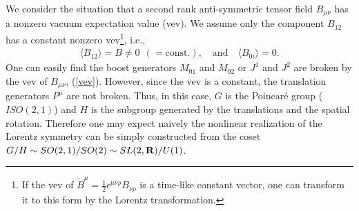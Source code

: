 \documentclass[a4paper,12pt]{article}
\begin{document}
We consider the situation that a 
second rank anti-symmetric tensor field $B_{\mu \nu}$
has a nonzero vacuum expectation value (vev).
We assume only the component $B_{12}$ has a constant 
nonzero vev\footnote{If the vev of $\tilde{B}^{\mu} = \frac{1}{2}
\epsilon^{\mu \nu \rho} B_{\nu \rho}$ is a time-like constant vector, 
one can transform it to this form by the Lorentz transformation.}, i.e.,
\begin{eqnarray}
\langle B_{12} \rangle = B \neq 0~~(= \textrm{const.}), \quad
\textrm{and} \quad \langle B_{0i} \rangle = 0. \label{vev}
\end{eqnarray}
One can easily find the boost generators $M_{01}$ and $M_{02}$ or
$J^{1}$ and $J^{2}$ are broken by the vev of $B_{\mu \nu}$, (\ref{vev}). 
However, since the vev is a constant, the translation generators
$P^{\mu}$ are not broken. Thus, in this case, $G$ is the Poincar\'e group
($ISO(2,1)$) and $H$ is the subgroup generated by the translations and
the spatial rotation. Therefore one may expect naively 
the nonlinear realization of the Lorentz symmetry can be 
simply constructed from the coset $G/H \sim
SO(2,1)/SO(2) \sim SL(2,{\bf R})/U(1)$.
\end{document}
